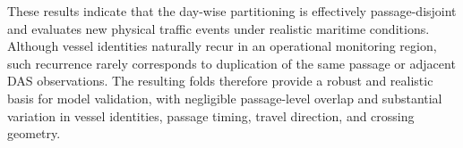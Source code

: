 These results indicate that the day-wise partitioning is effectively passage-disjoint and evaluates new physical traffic events under realistic maritime conditions. Although vessel identities naturally recur in an operational monitoring region, such recurrence rarely corresponds to duplication of the same passage or adjacent DAS observations. The resulting folds therefore provide a robust and realistic basis for model validation, with negligible passage-level overlap and substantial variation in vessel identities, passage timing, travel direction, and crossing geometry.


